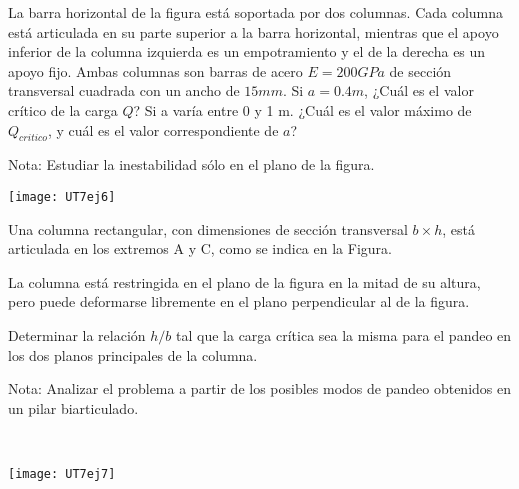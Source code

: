 %
%	
%	





\ejercicio

La barra horizontal de la figura está soportada por dos columnas. Cada columna está articulada en su parte superior a la barra horizontal, mientras que el apoyo inferior de la columna izquierda es un empotramiento y el de la derecha es un apoyo fijo. Ambas columnas son barras de acero $E=200GPa$ de sección transversal cuadrada con un ancho de $15 mm$.
\parte Si $a=0.4m$, ¿Cuál es el valor crítico de la carga $Q$?
\parte Si a varía entre 0 y 1 m. ¿Cuál es el valor máximo de $Q_{critico}$, y cuál es el valor correspondiente de $a$?

Nota: Estudiar la inestabilidad sólo en el plano de la figura.

\begin{center}
	\texttt{[image: UT7ej6]}
\end{center}





\ejercicio

\begin{minipage}[b]{0.6\textwidth}
	
	Una columna rectangular, con dimensiones de sección transversal $b \times h$, está articulada en los extremos A y C, como se indica en la Figura.
	
	La columna está restringida en el plano de la figura en la mitad de su altura, pero puede deformarse libremente en el plano perpendicular al de la figura.
	
	Determinar la relación $h/b$ tal que la carga crítica sea la misma para el pandeo en los dos planos principales de la columna.
	
	Nota: Analizar el problema a partir de los posibles modos de pandeo obtenidos en un pilar biarticulado.
	
\end{minipage}
~
\begin{minipage}[b]{0.4\textwidth}
	\begin{center}
		\texttt{[image: UT7ej7]}
	\end{center}
\end{minipage}





